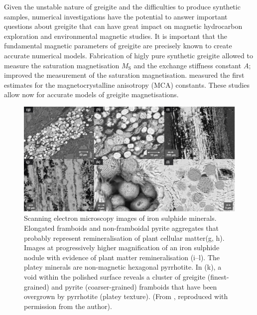 Given the unstable nature of greigite and the difficulties to produce synthetic samples, numerical investigations have the potential to answer important questions about greigite that can have great impact on magnetic hydrocarbon exploration and environmental magnetic studies. It is important that the fundamental magnetic parameters of greigite are precisely known to create accurate numerical models. Fabrication of higly pure synthetic greigite allowed \citet{Chang2008} to measure the saturation magnetisation $M_\text{S}$ and the exchange stiffness constant $A$; \citet{Li2014} improved the measurement of the saturation magnetisation. \citet{Winklhofer2014} measured the first estimates for the magnetocrystalline anisotropy (MCA) constants. These studies allow now for accurate models of greigite magnetisations.
\begin{figure}
\centering
\includegraphics[width=\textwidth]{intro/figs/greigite_framboids.pdf}
\caption[SEM images of framboidal greigite]{Scanning electron microscopy images of iron sulphide minerals. Elongated framboids and non-framboidal pyrite aggregates that probably represent remineralisation of plant cellular matter(g, h). Images at progressively higher magnification of an iron sulphide nodule with evidence of plant matter remineralisation (i--l). The platey minerals are non-magnetic hexagonal pyrrhotite. In (k), a void within the polished surface reveals a cluster of greigite (finest-grained) and pyrite (coarser-grained) framboids that have been overgrown by pyrrhotite (platey texture). (From \citet{Roberts2015}, reproduced with permission from the author).}
\label{intro_01}
\end{figure}
\par

